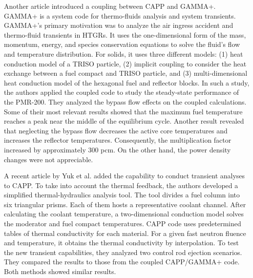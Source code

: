 Another article \cite{tak_cappgamma_2016} introduced a coupling between CAPP and GAMMA+.
GAMMA+ is a system code for thermo-fluids analysis and system transients.
GAMMA+'s primary motivation was to analyze the air ingress accident and thermo-fluid transients in \glspl{HTGR}.
It uses the one-dimensional form of the mass, momentum, energy, and species conservation equations to solve the fluid's flow and temperature distribution.
For solids, it uses three different models: (1) heat conduction model of a TRISO particle, (2) implicit coupling to consider the heat exchange between a fuel compact and TRISO particle, and (3) multi-dimensional heat conduction model of the hexagonal fuel and reflector blocks.
In such a study, the authors applied the coupled code to study the steady-state performance of the PMR-200.
They analyzed the bypass flow effects on the coupled calculations.
Some of their most relevant results showed that the maximum fuel temperature reaches a peak near the middle of the equilibrium cycle.
Another result revealed that neglecting the bypass flow decreases the active core temperatures and increases the reflector temperatures.
Consequently, the multiplication factor increased by approximately 300 pcm.
On the other hand, the power density changes were not appreciable.

A recent article by Yuk et al. \cite{yuk_time-dependent_2020} added the capability to conduct transient analyses to CAPP.
To take into account the thermal feedback, the authors developed a simplified thermal-hydraulics analysis tool.
The tool divides a fuel column into six triangular prisms.
Each of them hosts a representative coolant channel.
After calculating the coolant temperature, a two-dimensional conduction model solves the moderator and fuel compact temperatures.
CAPP code uses predetermined tables of thermal conductivity for each material.
For a given fast neutron fluence and temperature, it obtains the thermal conductivity by interpolation.
To test the new transient capabilities, they analyzed two control rod ejection scenarios.
They compared the results to those from the coupled CAPP/GAMMA+ code.
Both methods showed similar results.

